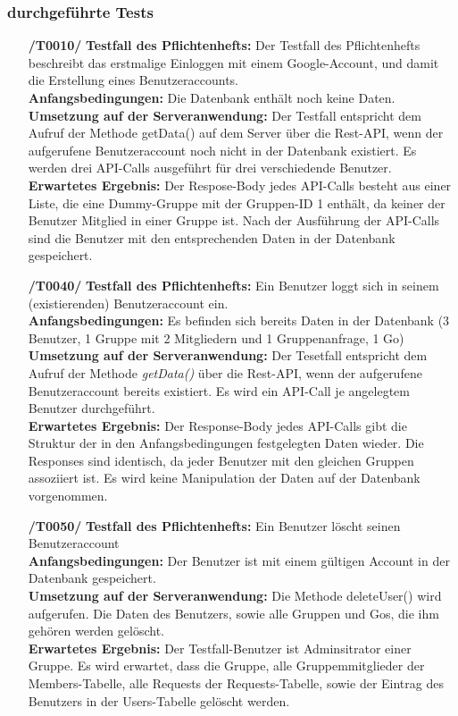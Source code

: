 \documentclass[11pt,a4paper]{scrartcl}
\begin{document}
\subsubsection{durchgeführte Tests}
\begin{enumerate}
	\item[\textbf{/T0010/}]
	\textbf{Testfall des Pflichtenhefts: }Der Testfall des Pflichtenhefts beschreibt das erstmalige Einloggen mit einem Google-Account, und damit die Erstellung eines Benutzeraccounts.\\
	\textbf{Anfangsbedingungen: }Die Datenbank enthält noch keine Daten.\\
	\textbf{Umsetzung auf der Serveranwendung: }Der Testfall entspricht dem Aufruf der Methode getData() auf dem Server über die Rest-API, wenn der aufgerufene Benutzeraccount noch nicht in der Datenbank existiert. Es werden drei API-Calls ausgeführt für drei verschiedende Benutzer.\\
	\textbf{Erwartetes Ergebnis: } Der Respose-Body jedes API-Calls besteht aus einer Liste, die eine Dummy-Gruppe mit der Gruppen-ID 1 enthält, da keiner der Benutzer Mitglied in einer Gruppe ist. Nach der Ausführung der API-Calls sind die Benutzer mit den entsprechenden Daten in der Datenbank gespeichert.
	
	\item[\textbf{/T0040/}]
	\textbf{Testfall des Pflichtenhefts: }Ein Benutzer loggt sich in seinem (existierenden) Benutzeraccount ein.\\
	\textbf{Anfangsbedingungen: }Es befinden sich bereits Daten in der Datenbank (3 Benutzer, 1 Gruppe mit 2 Mitgliedern und 1 Gruppenanfrage, 1 Go)\\
	\textbf{Umsetzung auf der Serveranwendung: }Der Tesetfall entspricht dem Aufruf der Methode \textit{getData()} über die Rest-API, wenn der aufgerufene Benutzeraccount bereits existiert. Es wird ein API-Call je angelegtem Benutzer durchgeführt.\\
	\textbf{Erwartetes Ergebnis: }Der Response-Body jedes API-Calls gibt die Struktur der in den Anfangsbedingungen festgelegten Daten wieder. Die Responses sind identisch, da jeder Benutzer mit den gleichen Gruppen assoziiert ist. Es wird keine Manipulation der Daten auf der Datenbank vorgenommen.
	
	\item[\textbf{/T0050/}]
	\textbf{Testfall des Pflichtenhefts: }Ein Benutzer löscht seinen Benutzeraccount\\
	\textbf{Anfangsbedingungen: }Der Benutzer ist mit einem gültigen Account in der Datenbank gespeichert.\\
	\textbf{Umsetzung auf der Serveranwendung: }Die Methode deleteUser() wird aufgerufen. Die Daten des Benutzers, sowie alle Gruppen und Gos, die ihm gehören werden gelöscht.\\
	\textbf{Erwartetes Ergebnis: }Der Testfall-Benutzer ist Adminsitrator einer Gruppe. Es wird erwartet, dass die Gruppe, alle Gruppemmitglieder der Members-Tabelle, alle Requests der Requests-Tabelle, sowie der Eintrag des Benutzers in der Users-Tabelle gelöscht werden.
	

\end{enumerate}
\end{document}

